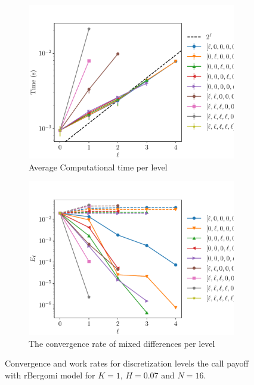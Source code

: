 \documentclass[11pt]{article}
\begin{document}
\begin{figure}[!h]
	\centering
	\begin{subfigure}{.4\textwidth}
		\centering
		\includegraphics[width=0.95\linewidth]{./figures/bergomi_misc/H_007/N_16/level_work.pdf}
		\caption{Average Computational time per level}
		\label{fig:misc_rbergomi_8_steps_sub3}
	\end{subfigure}%
	\begin{subfigure}{.4\textwidth}
		\centering
		\includegraphics[width=0.95\linewidth]{./figures/bergomi_misc/H_007/N_16/levels_error_rate.pdf}
		\caption{  The convergence rate of mixed differences per level}
		\label{fig:misc_rbergomi_8_steps_sub4}
	\end{subfigure}%
	\caption{Convergence and work rates for discretization levels  the call payoff with rBergomi model for $K=1$, $H=0.07$ and $N=16$.}
	\label{fig:misc_rbergomi_8_steps_2}
\end{figure}
\end{document}
